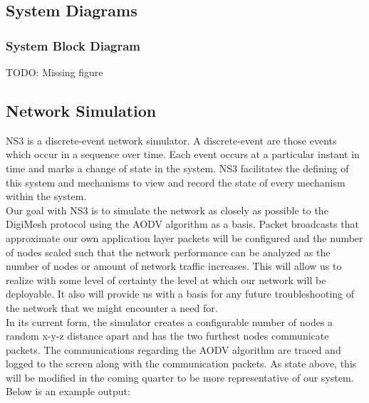 \documentclass[journal,compsoc]{IEEEtran}
\begin{document}
\subsection{System Diagrams}

\subsubsection{System Block Diagram}

TODO: Missing figure

\subsection{Network Simulation}

NS3 is a discrete-event network simulator. A discrete-event are those events which occur in a sequence over time. Each event occurs at a particular instant in time and marks a change of state in the system. NS3 facilitates the defining of this system and mechanisms to view and record the state of every mechanism within the system.\\

\noindent Our goal with NS3 is to simulate the network as closely as possible to the DigiMesh protocol using the AODV algorithm as a basis. Packet broadcasts that approximate our own application layer packets will be configured and the number of nodes scaled such that the network performance can be analyzed as the number of nodes or amount of network traffic increases. This will allow us to realize with some level of certainty the level at which our network will be deployable. It also will provide us with a basis for any future troubleshooting of the network that we might encounter a need for.\\

\noindent In its current form, the simulator creates a configurable number of nodes a random x-y-z distance apart and has the two furthest nodes communicate packets. The communications regarding the AODV algorithm are traced and logged to the screen along with the communication packets. As state above, this will be modified in the coming quarter to be more representative of our system.\\

\noindent Below is an example output:
\end{document}
